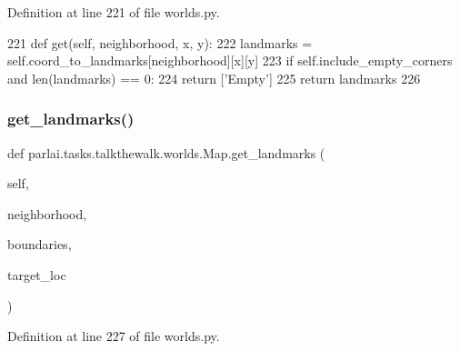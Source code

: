 Definition at line 221 of file worlds.\+py.


\begin{DoxyCode}
221     \textcolor{keyword}{def }get(self, neighborhood, x, y):
222         landmarks = self.coord\_to\_landmarks[neighborhood][x][y]
223         \textcolor{keywordflow}{if} self.include\_empty\_corners \textcolor{keywordflow}{and} len(landmarks) == 0:
224             \textcolor{keywordflow}{return} [\textcolor{stringliteral}{'Empty'}]
225         \textcolor{keywordflow}{return} landmarks
226 
\end{DoxyCode}
\mbox{\label{classparlai_1_1tasks_1_1talkthewalk_1_1worlds_1_1Map_af080964b1e6043ad8d6e1634932c82ca}} 
\subsubsection{\texorpdfstring{get\+\_\+landmarks()}{get\_landmarks()}}
{\footnotesize\ttfamily def parlai.\+tasks.\+talkthewalk.\+worlds.\+Map.\+get\+\_\+landmarks (\begin{DoxyParamCaption}\item[{}]{self,  }\item[{}]{neighborhood,  }\item[{}]{boundaries,  }\item[{}]{target\+\_\+loc }\end{DoxyParamCaption})}



Definition at line 227 of file worlds.\+py.


